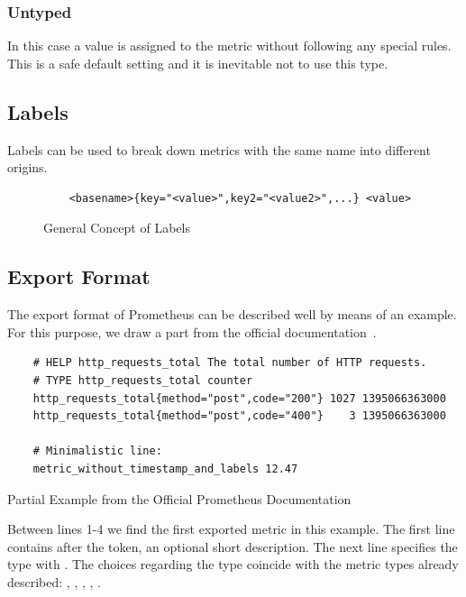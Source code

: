 \subsubsection{Untyped}
In this case a value is assigned to the metric without following any special rules. This is a safe default setting and it is inevitable not to use this type.
\subsection{Labels}
Labels can be used to break down metrics with the same name into different origins. 
\begin{figure}[!ht]
	\begin{verbatim}
	<basename>{key="<value>",key2="<value2>",...} <value>
	\end{verbatim}
	\caption{General Concept of Labels}
\end{figure}
\subsection{Export Format}
\label{subsec:Exportformat}
The export format of Prometheus can be described well by means of an example. For this purpose, we draw a part from the official documentation~\cite{PrometheusExpositionFormatBeispiel}.\\
\par
\begin{listing}[H]
	\begin{verbatim}
	# HELP http_requests_total The total number of HTTP requests.
	# TYPE http_requests_total counter
	http_requests_total{method="post",code="200"} 1027 1395066363000
	http_requests_total{method="post",code="400"}    3 1395066363000
	
	# Minimalistic line:
	metric_without_timestamp_and_labels 12.47
	\end{verbatim}
	\caption{Partial Example from the Official Prometheus Documentation~\cite{PrometheusExpositionFormatBeispiel}}
\end{listing}
Between lines 1-4 we find the first exported metric in this example. The first line contains  after the token, an optional short description. The next line specifies the type with \linebreak {}. The choices regarding the type coincide with the metric types already described: , , , , .

